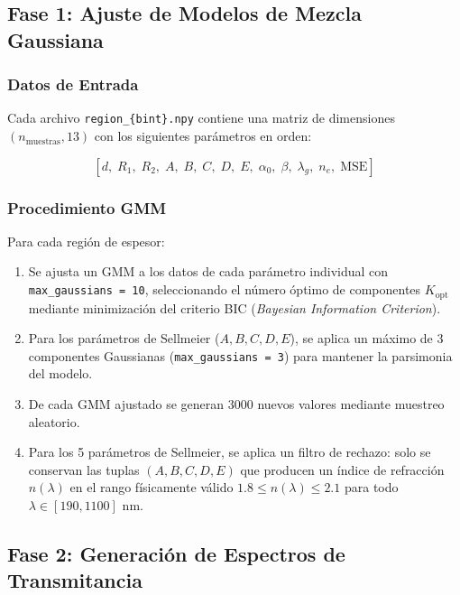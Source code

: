 \documentclass{article}
\begin{document}
\subsection{Fase 1: Ajuste de Modelos de Mezcla Gaussiana}

\subsubsection{Datos de Entrada}

Cada archivo \texttt{region\_\{bint\}.npy} contiene una matriz de dimensiones $(n_{\text{muestras}}, 13)$ con los siguientes par\'ametros en orden:

\[
[d,\; R_1,\; R_2,\; A,\; B,\; C,\; D,\; E,\; \alpha_0,\; \beta,\; \lambda_g,\; n_e,\; \text{MSE}]
\]

\subsubsection{Procedimiento GMM}

Para cada regi\'on de espesor:
\begin{enumerate}
    \item Se ajusta un GMM a los datos de cada par\'ametro individual con \texttt{max\_gaussians = 10}, seleccionando el n\'umero \'optimo de componentes $K_{\text{opt}}$ mediante minimizaci\'on del criterio BIC (\textit{Bayesian Information Criterion}).
    \item Para los par\'ametros de Sellmeier ($A, B, C, D, E$), se aplica un m\'aximo de 3 componentes Gaussianas (\texttt{max\_gaussians = 3}) para mantener la parsimonia del modelo.
    \item De cada GMM ajustado se generan 3000 nuevos valores mediante muestreo aleatorio.
    \item Para los 5 par\'ametros de Sellmeier, se aplica un filtro de rechazo: solo se conservan las tuplas $(A, B, C, D, E)$ que producen un \'indice de refracci\'on $n(\lambda)$ en el rango f\'isicamente v\'alido $1.8 \leq n(\lambda) \leq 2.1$ para todo $\lambda \in [190, 1100]$ nm.
\end{enumerate}

\subsection{Fase 2: Generaci\'on de Espectros de Transmitancia}
\end{document}
